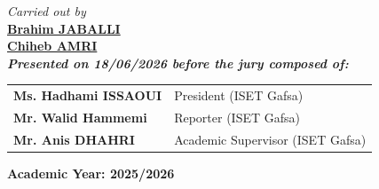 \begin{titlepage}
\begin{center}
    \vspace{1.0cm}
    
    {\fontsize{12pt}{14pt}\selectfont\itshape Carried out by}\\[0.4cm]
    {\fontsize{13pt}{15pt}\selectfont\bfseries\underline{Brahim JABALLI}}\\[0.2cm]
    {\fontsize{13pt}{15pt}\selectfont\bfseries\underline{Chiheb AMRI}}\\[1.2cm]
    
    {\fontsize{10.5pt}{12.5pt}\selectfont\bfseries\itshape Presented on 18/06/2026 before the jury composed of:}\\[0.3cm]
    
    \renewcommand{\arraystretch}{1.3}
    \fontsize{10pt}{12pt}\selectfont
    \begin{tabular}{p{7.5cm}l}
    \hline
    \textbf{Ms. Hadhami ISSAOUI} & President (ISET Gafsa) \\
    \textbf{Mr. Walid Hammemi} & Reporter (ISET Gafsa) \\
    \textbf{Mr. Anis DHAHRI} & Academic Supervisor (ISET Gafsa) \\
    \hline
    \end{tabular}
    
    \vfill
    
    {\fontsize{11pt}{13pt}\selectfont\bfseries Academic Year: 2025/2026}
\end{center}

\end{titlepage}
